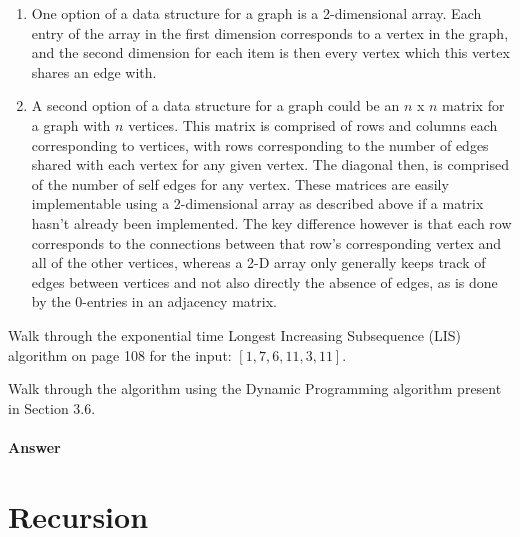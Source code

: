 \documentclass{article}
\begin{document}
\begin{enumerate}
	\item
		One option of a data structure for a graph is a 2-dimensional array. Each entry of the array in the first
		dimension corresponds to a vertex in the graph, and the second dimension for each item is then every vertex
		which this vertex shares an edge with.
	\item
		A second option of a data structure for a graph could be an $n$ x $n$ matrix for a graph with $n$ vertices.
		This matrix is comprised of rows and columns each corresponding to vertices, with rows corresponding to the
		number of edges shared with each vertex for any given vertex. The diagonal then, is comprised of the number
		of self edges for any vertex. These matrices are easily implementable using a 2-dimensional array as
		described above if a matrix hasn't already been implemented. The key difference however is that each row
		corresponds to the connections between that row's corresponding vertex and all of the other vertices, whereas
		a 2-D array only generally keeps track of edges between vertices and not also directly the absence of edges,
		as is done by the 0-entries in an adjacency matrix.
\end{enumerate}



\nextprob
{}

Walk through the exponential time Longest Increasing Subsequence (LIS) algorithm
on page 108 for the input: $\left[ 1, 7, 6, 11, 3, 11 \right]$.

Walk through the algorithm using the Dynamic Programming algorithm present in
Section 3.6.

\paragraph{Answer}
\section{Recursion}
\end{document}
